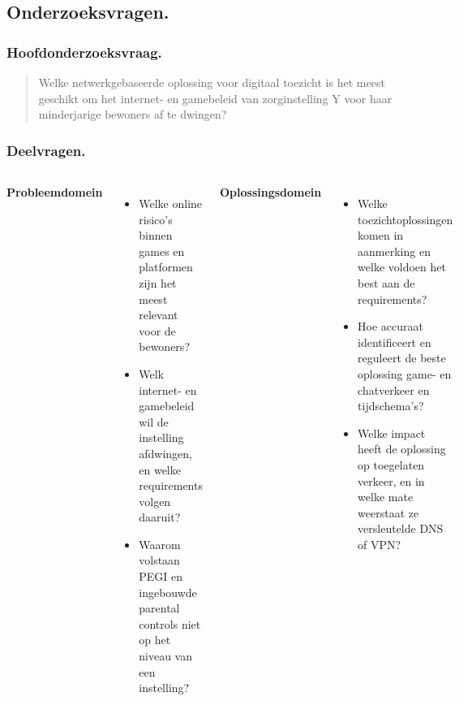\documentclass[aspectratio=169]{beamer}
\begin{document}
\subsection{Onderzoeksvragen.}

\begin{frame}
    \frametitle{Hoofdonderzoeksvraag.}

    \begin{quote}
        {\large Welke netwerkgebaseerde oplossing voor digitaal toezicht
        is het meest geschikt om het internet- en gamebeleid van
        zorginstelling Y voor haar minderjarige bewoners af te dwingen?}
    \end{quote}

    \bigskip

    
\end{frame}

\begin{frame}
    \frametitle{Deelvragen.}

    \begin{columns}[t]
        \textbf{Probleemdomein}
        \begin{itemize}
            \item Welke online risico's binnen games en platformen zijn
                  het meest relevant voor de bewoners?
            \item Welk internet- en gamebeleid wil de instelling
                  afdwingen, en welke requirements volgen daaruit?
            \item Waarom volstaan PEGI en ingebouwde parental controls
                  niet op het niveau van een instelling?
        \end{itemize}

        \textbf{Oplossingsdomein}
        \begin{itemize}
            \item Welke toezichtoplossingen komen in aanmerking en welke
                  voldoen het best aan de requirements?
            \item Hoe accuraat identificeert en reguleert de beste
                  oplossing game- en chatverkeer en tijdschema's?
            \item Welke impact heeft de oplossing op toegelaten verkeer,
                  en in welke mate weerstaat ze versleutelde DNS of VPN?
        \end{itemize}
    \end{columns}
\end{frame}
\end{document}

